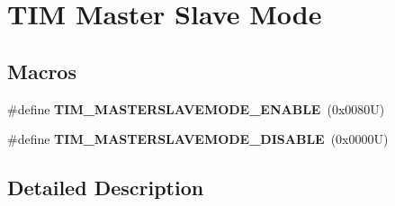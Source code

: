 \hypertarget{group___t_i_m___master___slave___mode}{}\section{T\+IM Master Slave Mode}
\label{group___t_i_m___master___slave___mode}
\subsection*{Macros}
\begin{DoxyCompactItemize}
\item 
\mbox{\label{group___t_i_m___master___slave___mode_gafdc0de07db4688aa8c87cf03220aaf28}} 
\#define {\bfseries T\+I\+M\+\_\+\+M\+A\+S\+T\+E\+R\+S\+L\+A\+V\+E\+M\+O\+D\+E\+\_\+\+E\+N\+A\+B\+LE}~(0x0080\+U)
\item 
\mbox{\label{group___t_i_m___master___slave___mode_ga58ff99ef1d6d6f187e3615f9d3ec3b8b}} 
\#define {\bfseries T\+I\+M\+\_\+\+M\+A\+S\+T\+E\+R\+S\+L\+A\+V\+E\+M\+O\+D\+E\+\_\+\+D\+I\+S\+A\+B\+LE}~(0x0000\+U)
\end{DoxyCompactItemize}


\subsection{Detailed Description}
